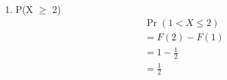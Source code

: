 \documentclass{article}
\providecommand{\pr}[1]{\ensuremath{\Pr\left(#1\right)}}
\begin{document}
\begin{enumerate}
\begin{enumerate}
        \item P(X $\geq$ 2)
        \begin{align}
            & \pr{1 < X \le 2} \\
            & = F(2) - F(1)\\
            & = 1 - \frac{1}{2}\\
            & = \frac{1}{2}
        \end{align}
    \end{enumerate}
\end{enumerate}
\end{document}

